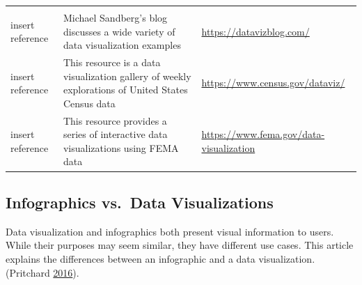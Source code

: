 \documentclass[]{book}
\theoremstyle{definition}
\theoremstyle{definition}
\theoremstyle{definition}
\theoremstyle{remark}
\begin{document}
\begin{longtable}[]{@{}lll@{}}
\begin{minipage}[t]{0.48\columnwidth}
\end{minipage}\tabularnewline
\begin{minipage}[t]{0.15\columnwidth}\raggedright\strut
insert reference\strut
\end{minipage} & \begin{minipage}[t]{0.28\columnwidth}\raggedright\strut
Michael Sandberg's blog discusses a wide variety of data visualization
examples\strut
\end{minipage} & \begin{minipage}[t]{0.48\columnwidth}\raggedright\strut
\url{https://datavizblog.com/}\strut
\end{minipage}\tabularnewline
\begin{minipage}[t]{0.15\columnwidth}\raggedright\strut
insert reference\strut
\end{minipage} & \begin{minipage}[t]{0.28\columnwidth}\raggedright\strut
This resource is a data visualization gallery of weekly explorations of
United States Census data\strut
\end{minipage} & \begin{minipage}[t]{0.48\columnwidth}\raggedright\strut
\url{https://www.census.gov/dataviz/}\strut
\end{minipage}\tabularnewline
\begin{minipage}[t]{0.15\columnwidth}\raggedright\strut
insert reference\strut
\end{minipage} & \begin{minipage}[t]{0.28\columnwidth}\raggedright\strut
This resource provides a series of interactive data visualizations using
FEMA data\strut
\end{minipage} & \begin{minipage}[t]{0.48\columnwidth}\raggedright\strut
\url{https://www.fema.gov/data-visualization}\strut
\end{minipage}\tabularnewline
\bottomrule
\end{longtable}

\subsection{Infographics vs.~Data
Visualizations}\label{infographics-vs.data-visualizations}

Data visualization and infographics both present visual information to
users. While their purposes may seem similar, they have different use
cases. This article explains the differences between an infographic and
a data visualization. (Pritchard
\protect\hyperlink{ref-VIZVSINFO}{2016}).
\end{document}
